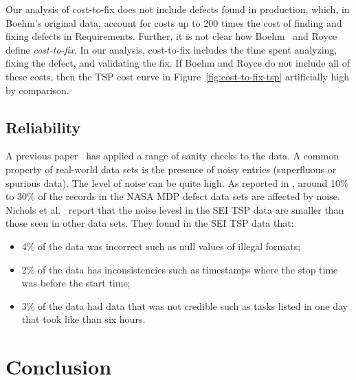 \documentclass{sig-alternate}
\newcommand{\todo}[1]{\textcolor{Maroon}{TODO: #1}}
\newcommand{\bi}{\begin{itemize}[leftmargin=0.4cm]}
\newcommand{\ei}{\end{itemize}}
\newcommand{\fig}[1]{Figure~\ref{fig:#1}}
\begin{document}
Our analysis of cost-to-fix does not include defects found in production, which, in Boehm's original data, account for costs up to 200 times the cost of finding and fixing defects in Requirements. Further, it is not clear how Boehm~\cite{Boehm81} and Royce~\cite{Royce98} define \emph{cost-to-fix}. In our analysis, cost-to-fix includes the time spent analyzing, fixing the defect, and validating the fix. If Boehm and Royce do not include all of these costs, then the TSP cost curve in \fig{cost-to-fix-tsp} artificially high by comparison.

\subsection{Reliability}
A previous paper~\cite{shirai14} has applied a range of sanity checks to the data.
A common property of real-world data sets is the presence
of noisy entries (superfluous  or spurious data). 
The level of noise can be quite high. As reported
in \cite{shepperd12}, around
10\% to 30\%
of the records in the NASA MDP defect data sets are
affected by noise. Nichols et al.~\cite{shirai14}  report that
the noise levesl in the SEI TSP data are smaller than those seen
in other data sets. They found in the SEI TSP data that:\bi 
\item
4\% of the data was incorrect such as  null values of illegal formats;
\item  2\% of the data has inconsistencies such as timestamps
where the stop time was before the start time;
\item 3\% of the data had data that was not credible
such as tasks listed in one day that took like than six hours.
\ei 

 

 
 
 \section{Conclusion}
 
\end{document}
